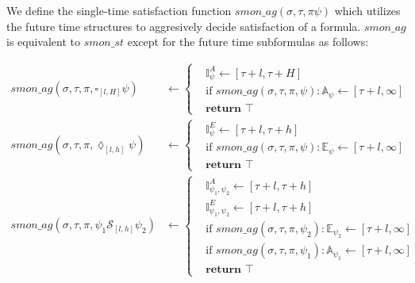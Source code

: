 \documentclass[10pt,a4paper]{article}
\begin{document}
We define the single-time satisfaction function $smon\_ag(\sigma, \tau, \pi \psi)$ which utilizes the future time structures to aggresively decide satisfaction of a formula. $smon\_ag$ is equivalent to $smon\_st$ except for the future time subformulas as follows:

\[
\begin{aligned}
smon\_ag(\sigma, \tau, \pi, \square_{[l,H]} \psi) & \leftarrow \left\lbrace
\begin{aligned}
	&\mathbb{I}^{A}_{\psi} \leftarrow [\tau+l, \tau+H]  \\
	&\text{if } smon\_ag(\sigma, \tau, \pi, \psi) \colon \mathbb{A}_{\psi} \leftarrow [\tau+l, \infty] \\
	&\textbf{return } \top 
\end{aligned} \right. \\
smon\_ag(\sigma, \tau, \pi,\lozenge_{[l,h]} \psi) & \leftarrow \left\lbrace
\begin{aligned}
	&\mathbb{I}^{E}_{\psi} \leftarrow [\tau+l, \tau+h] \\
	&\text{if } smon\_ag(\sigma, \tau, \pi, \psi) \colon \mathbb{E}_{\psi} \leftarrow [\tau+l, \infty] \\
	&\textbf{return } \top 
\end{aligned} \right. \\
smon\_ag(\sigma, \tau, \pi, \psi_1 \mathcal{S}_{[l,h]} \psi_2) & \leftarrow \left\lbrace
\begin{aligned}
	 &\mathbb{I}^{A}_{\psi_1,\psi_2} \leftarrow [\tau+l, \tau+h] \\
	 &\mathbb{I}^{E}_{\psi_1,\psi_2} \leftarrow [\tau+l, \tau+h] \\
	&\text{if } smon\_ag(\sigma, \tau, \pi, \psi_2) \colon \mathbb{E}_{\psi_2} \leftarrow [\tau+l, \infty] \\
	&\text{if } smon\_ag(\sigma, \tau, \pi, \psi_1) \colon \mathbb{A}_{\psi_1} \leftarrow [\tau+l, \infty] \\
	& \textbf{return } \top 
\end{aligned} \right. \\
\end{aligned}
\]
\end{document}
